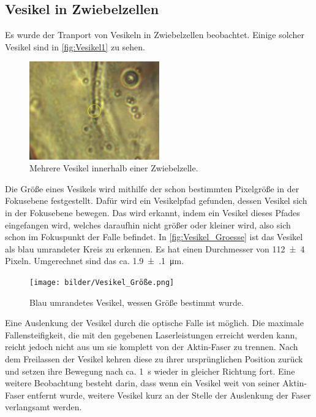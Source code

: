 \subsection{Vesikel in Zwiebelzellen}
    Es wurde der Tranport von Vesikeln in Zwiebelzellen beobachtet.
    Einige solcher Vesikel sind in \autoref{fig:Vesikel1} zu sehen.
    \begin{figure}[ht]
        \centering\captionsetup{format=plain}
        \includegraphics[width=0.5\textwidth]{bilder/Vesikel1.JPG}
        \caption{Mehrere Vesikel innerhalb einer Zwiebelzelle.}
        \label{fig:Vesikel1}
    \end{figure}
    \FloatBarrier
    Die Größe eines Vesikels wird mithilfe der schon bestimmten Pixelgröße in der Fokusebene festgestellt.
    Dafür wird ein Vesikelpfad gefunden, dessen Vesikel sich in der Fokusebene bewegen.
    Das wird erkannt, indem ein Vesikel dieses Pfades eingefangen wird, welches daraufhin nicht größer oder kleiner wird, also sich schon im Fokuspunkt der Falle befindet.
    In \autoref{fig:Vesikel_Groesse} ist das Vesikel als blau umrandeter Kreis zu erkennen.
    Es hat einen Durchmesser von \num{112(4)} Pixeln.
    Umgerechnet sind das ca. \qty{1.9(1)}{\um}.
    \begin{figure}[ht]
        \centering\captionsetup{format=plain}
        \texttt{[image: bilder/Vesikel\_Größe.png]}
        \caption{Blau umrandetes Vesikel, wessen Größe bestimmt wurde.}
        \label{fig:Vesikel_Groesse}
    \end{figure}
    \FloatBarrier
    Eine Auslenkung der Vesikel durch die optische Falle ist möglich.
    Die maximale Fallensteifigkeit, die mit den gegebenen Laserleistungen erreicht werden kann, reicht jedoch nicht aus um sie komplett von der Aktin-Faser zu trennen.
    Nach dem Freilassen der Vesikel kehren diese zu ihrer ursprünglichen Position zurück und setzen ihre Bewegung nach ca. \qty{1}{s} wieder in gleicher Richtung fort.
    Eine weitere Beobachtung besteht darin, dass wenn ein Vesikel weit von seiner Aktin-Faser entfernt wurde, weitere Vesikel kurz an der Stelle der Auslenkung der Faser verlangsamt werden.


